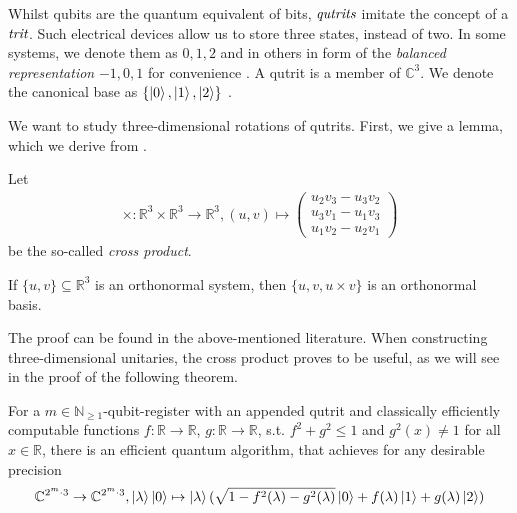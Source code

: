 Whilst qubits are the quantum equivalent of bits, \(\emph{qutrits}\) imitate the concept of a \(\emph{trit}\). Such electrical devices allow us to store three states, instead of two. In some systems, we denote them as \(0, 1, 2\) and in others in form of the \emph{balanced representation} \(-1, 0, 1\) for convenience \cite[p. 1]{Parhami_2013}. A qutrit is a member of \(\mathbb{C}^3\). We denote the canonical base as \(\{\ket{0}, \ket{1}, \ket{2}\}\) \cite[pp. 2-3]{Gokhale2019}.

We want to study three-dimensional rotations of qutrits. First, we give a lemma, which we derive from \cite[pp. 70-75]{Janich2010}.

\begin{definition}
    Let
    \begin{align}
        \times\colon \mathbb{R}^3 \times \mathbb{R}^3 \to \mathbb{R}^3, (u, v) \mapsto \begin{pmatrix}
            u_2v_3-u_3v_2\\
            u_3v_1-u_1v_3\\
            u_1v_2-u_2v_1
        \end{pmatrix}
    \end{align}
    be the so-called \emph{cross product}.
\end{definition}

\begin{lemma} \label{lemma_definition_cross_product}
    If \(\{u, v\} \subseteq \mathbb{R}^3\) is an orthonormal system, then \(\{u, v, u \times v\}\) is an orthonormal basis.
\end{lemma}

The proof can be found in the above-mentioned literature. When constructing three-dimensional unitaries, the cross product proves to be useful, as we will see in the proof of the following theorem.

\begin{theorem} \label{qutrit_rotation}
    For a \(m \in \mathbb{N}_{\geq 1}\)-qubit-register with an appended qutrit and classically efficiently computable functions \(f\colon \mathbb{R} \to \mathbb{R}\), \(g\colon \mathbb{R} \to \mathbb{R}\), s.t. \(f^2+g^2 \leq 1\) and \(g^2(x) \neq 1\) for all \(x \in \mathbb{R}\), there is an efficient quantum algorithm, that achieves for any desirable precision
    \begin{align}
        \mathbb{C}^{2^m \cdot 3} \to \mathbb{C}^{2^m \cdot 3}, \ket{\lambda}\ket{0} \mapsto \ket{\lambda}(\sqrt{1-f^2(\lambda)-g^2(\lambda)}\ket{0}+f(\lambda)\ket{1}+g(\lambda)\ket{2})
    \end{align}
\end{theorem}

